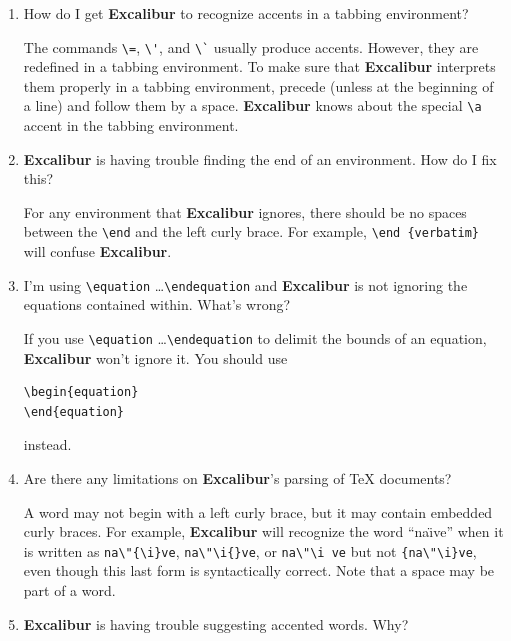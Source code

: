 ﻿\documentclass[11pt,titlepage]{article}
\newcommand{\ex}{\textbf{Excalibur}}
\begin{document}
\begin{enumerate}
  \ex{} knows a fair amount about \TeX/\LaTeX{} syntax. If it looks
  like it's skipping large portions of a file, it's probably because
  of an unmatched brace or some other syntax error. It's best to run
  it on a syntactically correct file. It will warn you if it thinks it
  found a syntax error.

\item How do I get \ex{} to recognize accents in a tabbing
  environment?

  The commands \verb+\=+, \verb+\'+, and \verb+\`+ usually produce
  accents. However, they are redefined in a tabbing environment. To
  make sure that \ex{} interprets them properly in a tabbing
  environment, precede (unless at the beginning of a line) and follow
  them by a space. \ex{} knows about the special \verb+\a+ accent in
  the tabbing environment.

\item \ex{} is having trouble finding the end of an environment.  How
  do I fix this?

  For any environment that \ex{} ignores, there should be no spaces
  between the \verb+\end+ and the left curly brace. For example,
  \verb+\end {verbatim}+ will confuse \ex.

\item I'm using \verb+\equation+ \ldots \verb+\endequation+ and
  \ex{} is not ignoring the equations contained within.  What's wrong?

  If you use \verb+\equation+ \ldots \verb+\endequation+ to delimit
  the bounds of an equation, \ex{} won't ignore it. You should use
\begin{verbatim}
\begin{equation}
\end{equation}
\end{verbatim}
  instead.

\item Are there any limitations on \ex's parsing of \TeX{} documents?

  A word may not begin with a left curly brace, but it may contain
  embedded curly braces. For example, \ex{} will recognize the word
  ``na\"\i ve'' when it is written as \verb+na\"{\i}ve+,
  \verb+na\"\i{}ve+, or \verb+na\"\i ve+ but not \verb+{na\"\i}ve+,
  even though this last form is syntactically correct. Note that a
  space may be part of a word.

\item \ex{} is having trouble suggesting accented words.  Why?


\end{enumerate}
\end{document}
